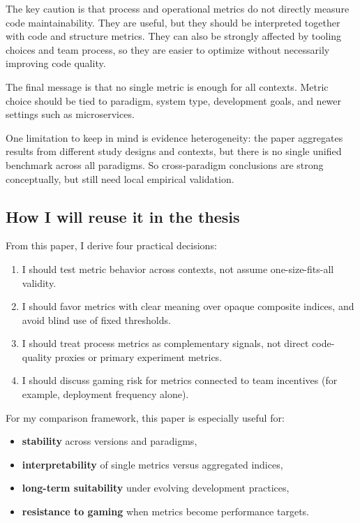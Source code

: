 \documentclass[11pt,a4paper]{article}
\begin{document}
The key caution is that process and operational metrics do not directly measure code maintainability. They are useful, but they should be interpreted together with code and structure metrics. They can also be strongly affected by tooling choices and team process, so they are easier to optimize without necessarily improving code quality.

The final message is that no single metric is enough for all contexts. Metric choice should be tied to paradigm, system type, development goals, and newer settings such as microservices.

One limitation to keep in mind is evidence heterogeneity: the paper aggregates results from different study designs and contexts, but there is no single unified benchmark across all paradigms. So cross-paradigm conclusions are strong conceptually, but still need local empirical validation.

\subsection{How I will reuse it in the thesis}
From this paper, I derive four practical decisions:
\begin{enumerate}[leftmargin=*]
  \item I should test metric behavior across contexts, not assume one-size-fits-all validity.
  \item I should favor metrics with clear meaning over opaque composite indices, and avoid blind use of fixed thresholds.
  \item I should treat process metrics as complementary signals, not direct code-quality proxies or primary experiment metrics.
  \item I should discuss gaming risk for metrics connected to team incentives (for example, deployment frequency alone).
\end{enumerate}

For my comparison framework, this paper is especially useful for:
\begin{itemize}[leftmargin=*]
  \item \textbf{stability} across versions and paradigms,
  \item \textbf{interpretability} of single metrics versus aggregated indices,
  \item \textbf{long-term suitability} under evolving development practices,
  \item \textbf{resistance to gaming} when metrics become performance targets.
\end{itemize}
\end{document}
